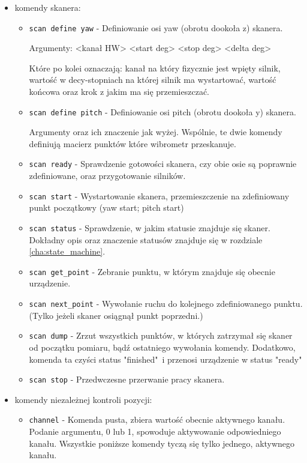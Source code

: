 \begin{itemize}
    \item komendy skanera:
    \begin{itemize}
        \item \texttt{scan define yaw} - Definiowanie osi yaw (obrotu dookoła z) skanera.
        
        Argumenty: <kanał HW> <start deg> <stop deg> <delta deg>

        Które po kolei oznaczają: kanał na który fizycznie jest wpięty silnik, wartość w decy-stopniach na której silnik ma wystartować, wartość końcowa oraz krok z jakim ma się przemieszczać.

        \item \texttt{scan define pitch} - Definiowanie osi pitch (obrotu dookoła y) skanera.

        Argumenty oraz ich znaczenie jak wyżej. Wspólnie, te dwie komendy definiują macierz punktów które wibrometr przeskanuje.

        \item \texttt{scan ready} - Sprawdzenie gotowości skanera, czy obie osie są poprawnie zdefiniowane, oraz przygotowanie silników.

        \item \texttt{scan start} - Wystartowanie skanera, przemieszczenie na zdefiniowany punkt początkowy (yaw start; pitch start)

        \item \texttt{scan status} - Sprawdzenie, w jakim statusie znajduje się skaner. Dokładny opis oraz znaczenie statusów znajduje się w rozdziale \ref{cha:state_machine}.

        \item \texttt{scan get\_point} - Zebranie punktu, w którym znajduje się obecnie urządzenie.

        \item \texttt{scan next\_point} - Wywołanie ruchu do kolejnego zdefiniowanego punktu. (Tylko jeżeli skaner osiągnął punkt poprzedni.)

        \item \texttt{scan dump} - Zrzut wszystkich punktów, w których zatrzymał się skaner od początku pomiaru, bądź ostatniego wywołania komendy. Dodatkowo, komenda ta czyści status "finished"\ i przenosi urządzenie w status "ready"

        \item \texttt{scan stop} - Przedwczesne przerwanie pracy skanera.        
    \end{itemize}
    \item komendy niezależnej kontroli pozycji:
    \begin{itemize}
        \item \texttt{channel} - Komenda pusta, zbiera wartość obecnie aktywnego kanału. Podanie argumentu, 0 lub 1, spowoduje aktywowanie odpowiedniego kanału. Wszystkie poniższe komendy tyczą się tylko jednego, aktywnego kanału.


\end{itemize}
\end{itemize}

